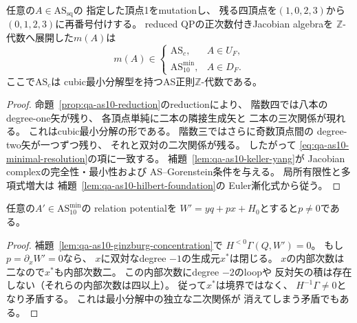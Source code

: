 \begin{theorem}[mutation像のAS条件]
\label{thm:qa-as10-forward-as}
任意の$A\in\mathrm{AS}_{\mathrm{sq}}$の
指定した頂点1をmutationし、
残る四頂点を$(1,0,2,3)$から
$(0,1,2,3)$に再番号付けする。
reduced QPの正次数付きJacobian algebraを
$\mathbb Z$-代数へ展開した$m(A)$は
\[
m(A)\in
\begin{cases}
\mathrm{AS}_{c},&A\in U_F,\\
\mathrm{AS}_{10}^{\mathrm{min}},&A\in D_F.
\end{cases}
\]
ここで$\mathrm{AS}_{c}$は
cubic最小分解型を持つAS正則$\mathbb Z$-代数である。
\end{theorem}
\begin{proof}
命題~\ref{prop:qa-as10-reduction}のreductionにより、
階数四では八本のdegree-one矢が残り、
各頂点単純に二本の隣接生成矢と
二本の三次関係が現れる。
これはcubic最小分解の形である。
階数三ではさらに奇数頂点間の
degree-two矢が一つずつ残り、
それと双対の二次関係が残る。
したがって
\eqref{eq:qa-as10-minimal-resolution}の項に一致する。
補題~\ref{lem:qa-as10-keller-yang}が
Jacobian complexの完全性・最小性および
AS--Gorenstein条件を与える。
局所有限性と多項式増大は
補題~\ref{lem:qa-as10-hilbert-foundation}の
Euler漸化式から従う。
\end{proof}

\begin{lemma}[独立targetの逆QPに必要な非零性]
\label{lem:qa-as10-nonzero-p}
任意の$A'\in\mathrm{AS}_{10}^{\mathrm{min}}$の
relation potentialを
$W'=yq+px+H_0$とすると$p\ne0$である。
\end{lemma}
\begin{proof}
補題~\ref{lem:qa-as10-ginzburg-concentration}で
$H^{<0}\Gamma(Q,W')=0$。
もし$p=\partial_xW'=0$なら、
$x$に双対なdegree $-1$の生成元$x^*$は閉じる。
$x$の内部次数は二なので$x^*$も内部次数二。
この内部次数にdegree $-2$のloopや
反対矢の積は存在しない（それらの内部次数は四以上）。
従って$x^*$は境界ではなく、
$H^{-1}\Gamma\ne0$となり矛盾する。
これは最小分解中の独立な二次関係が
消えてしまう矛盾でもある。
\end{proof}


